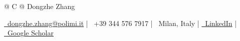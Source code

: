 \documentclass[a4paper,8pt]{article}
\begin{document}
\pagestyle{empty} 

\begin{tabularx}{\linewidth}{@{} C @{}}
\Huge{Dongzhe Zhang} \\[6pt]
\end{tabularx}

\begin{center}
    \href{mailto:dongzhe.zhang@polimi.it}{\faEnvelope\ dongzhe.zhang@polimi.it} \quad|\quad
    \faPhone\ +39 344 576 7917 \quad|\quad
    \faMapMarker\ Milan, Italy \quad|\quad
    \href{https://www.linkedin.com/in/dongzhe-zhang-88aa95280}{\faLinkedin\ LinkedIn} \quad|\quad
    \href{https://scholar.google.com.hk/citations?user=xjqVk8MAAAAJ&hl=zh-CN}{\faGraduationCap\ Google Scholar}
\end{center}

\end{document}
